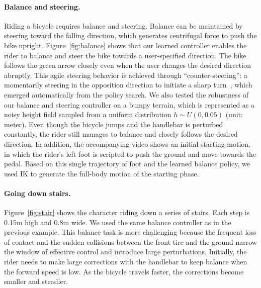 \paragraph{Balance and steering.} Riding a bicycle requires balance and steering. Balance can be maintained by steering toward the falling direction, which generates centrifugal force to push the bike upright. Figure~\ref{fig:balance} shows that our learned controller enables the rider to balance and steer the bike towards a user-specified direction. The bike follows the green arrow closely even when the user changes the desired direction abruptly. This agile steering behavior is achieved through ``counter-steering'': a momentarily steering in the opposition direction to initiate a sharp turn~\cite{Rankine1870}, which emerged automatically from the policy search. We also tested the robustness of our balance and steering controller on a bumpy terrain, which is represented as a noisy height field sampled from a uniform distribution $h\sim U(0, 0.05)$ (unit: meter). Even though the bicycle jumps and the handlebar is perturbed constantly, the rider still manages to balance and closely follows the desired direction. In addition, the accompanying video shows an initial starting motion, in which the rider's left foot is scripted to push the ground and move towards the pedal. Based on this single trajectory of foot and the learned balance policy, we used IK to generate the full-body motion of the starting phase.

\paragraph{Going down stairs.} Figure~\ref{fig:stair} shows the character riding down a series of stairs. Each step is 0.15m high and 0.8m wide. We used the same balance controller as in the previous example. This balance task is more challenging because the frequent loss of contact and the sudden collisions between the front tire and the ground narrow the window of effective control and introduce large perturbations. Initially, the rider needs to make large corrections with the handlebar to keep balance when the forward speed is low. As the bicycle travels faster, the corrections become smaller and steadier.
\vspace{-0.05in}

